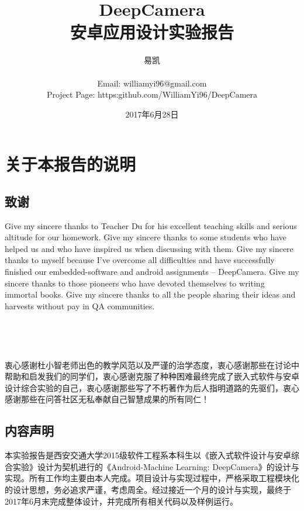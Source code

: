 \documentclass[UTF8, Microsoft YaHei]{book}
\title{\Huge{DeepCamera\\}\huge{安卓应用设计实验报告}}
\author{\huge{易凯\\ \\ Email: williamyi96@gmail.com\\ Project Page: https:github.com/WilliamYi96/DeepCamera}}
\date{\huge{2017年6月28日}}
\begin{document}
  \maketitle
  \vspace{15mm}





    \newpage
    \tableofcontents
    \newpage

    \chapter{关于本报告的说明}
    \section{致谢}
    Give my sincere thanks to Teacher Du for his excellent teaching skills and serious altitude for our homework. Give my sincere thanks to some students who have helped us and who have inspired us when discussing with them. Give my sincere thanks to myself because I've overcome all difficulties and have successfully finished our embedded-software and android assignments -- DeepCamera. Give my sincere thanks to those pioneers who have devoted themselves to writing immortal books. Give my sincere thanks to all the people sharing their ideas and harvests without pay in QA communities.

    ~

    ~

    衷心感谢杜小智老师出色的教学风范以及严谨的治学态度，衷心感谢那些在讨论中帮助和启发我们的同学们，衷心感谢克服了种种困难最终完成了嵌入式软件与安卓设计综合实验的自己，衷心感谢那些写了不朽著作为后人指明道路的先驱们，衷心感谢那些在问答社区无私奉献自己智慧成果的所有同仁！
    \newpage

    \section{内容声明}
    本实验报告是西安交通大学2015级软件工程系本科生以《嵌入式软件设计与安卓综合实验》设计为契机进行的《Android-Machine Learning: DeepCamera》的设计与实现。所有工作均主要由本人完成。项目设计与实现过程中，严格采取工程模块化的设计思想，务必追求严谨，考虑周全。经过接近一个月的设计与实现，最终于2017年6月末完成整体设计，并完成所有相关代码以及样例运行。
\end{document}
